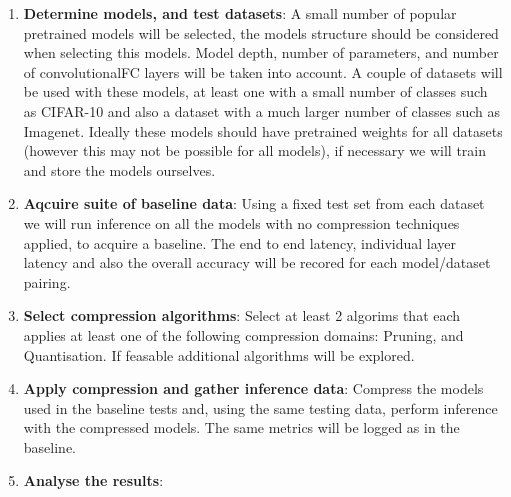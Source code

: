 \documentclass[../../D1.tex]{subfiles}
\begin{document}
\begin{enumerate}
    \item \textbf{Determine models, and test datasets}: A small number of popular pretrained models will be selected, the models structure should be considered when selecting this models. Model depth, number of parameters, and number of convolutional\/FC layers will be taken into account. A couple of datasets will be used with these models, at least one with a small number of classes such as CIFAR-10 and also a dataset with a much larger number of classes such as Imagenet. Ideally these models should have pretrained weights for all datasets (however this may not be possible for all models), if necessary we will train and store the models ourselves.
    \item \textbf{Aqcuire suite of baseline data}: Using a fixed test set from each dataset we will run inference on all the models with no compression techniques applied, to acquire a baseline. The end to end latency, individual layer latency and also the overall accuracy will be recored for each model/dataset pairing.
    \item \textbf{Select compression algorithms}: Select at least 2 algorims that each applies at least one of the following compression domains: Pruning, and Quantisation. If feasable additional algorithms will be explored.
    \item \textbf{Apply compression and gather inference data}: Compress the models used in the baseline tests and, using the same testing data, perform inference with the compressed models. The same metrics will be logged as in the baseline.
    \item \textbf{Analyse the results}: 
\end{enumerate}
\end{document}
